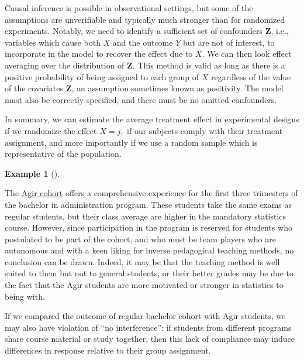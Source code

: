 \documentclass[
  11pt,
  letterpaper,
]{scrbook}
\theoremstyle{definition}
\theoremstyle{definition}
\newtheorem{example}{Example}[chapter]
\theoremstyle{remark}
\begin{document}
\begin{tcolorbox}[enhanced jigsaw, opacityback=0, opacitybacktitle=0.6, leftrule=.75mm, colbacktitle=quarto-callout-caution-color!10!white, breakable, toptitle=1mm, bottomrule=.15mm, title=\textcolor{quarto-callout-caution-color}{\faFire}\hspace{0.5em}{Conditional ignorability for observational data}, coltitle=black, colframe=quarto-callout-caution-color-frame, colback=white, left=2mm, toprule=.15mm, arc=.35mm, bottomtitle=1mm, titlerule=0mm, rightrule=.15mm]

Causal inference is possible in observational settings, but some of the
assumptions are unverifiable and typically much stronger than for
randomized experiments. Notably, we need to identify a sufficient set of
confounders \(\boldsymbol{Z}\), i.e., variables which cause both \(X\)
and the outcome \(Y\) but are not of interest, to incorporate in the
model to recover the effect due to \(X\). We can then look effect
averaging over the distribution of \(\boldsymbol{Z}\). This method is
valid as long as there is a positive probability of being assigned to
each group of \(X\) regardless of the value of the covariates
\(\boldsymbol{Z}\), an assumption sometimes known as positivity. The
model must also be correctly specified, and there must be no omitted
confounders.

\end{tcolorbox}

In summary, we can estimate the average treatment effect in experimental
designs if we randomize the effect \(X=j,\) if our subjects comply with
their treatment assignment, and more importantly if we use a random
sample which is representative of the population.

\begin{example}[]\protect\hypertarget{exm-nonrandomtreatment}{}\label{exm-nonrandomtreatment}

The
\href{https://www.hec.ca/programmes/baccalaureats/parcours-agir/index.html}{Agir
cohort} offers a comprehensive experience for the first three trimesters
of the bachelor in administration program. These students take the same
exams as regular students, but their class average are higher in the
mandatory statistics course. However, since participation in the program
is reserved for students who postulated to be part of the cohort, and
who must be team players who are autonomous and with a keen liking for
inverse pedagogical teaching methods, no conclusion can be drawn.
Indeed, it may be that the teaching method is well suited to them but
not to general students, or their better grades may be due to the fact
that the Agir students are more motivated or stronger in statistics to
being with.

If we compared the outcome of regular bachelor cohort with Agir
students, we may also have violation of ``no interference'': if students
from different programs share course material or study together, then
this lack of compliance may induce differences in response relative to
their group assignment.

\end{example}
\end{document}
